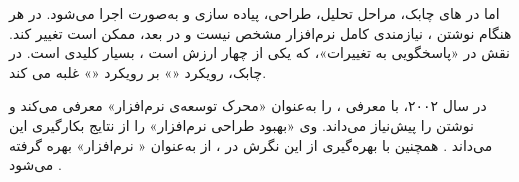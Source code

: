 اما در ‌های چابک، مراحل تحلیل، طراحی، پیاده سازی و
 به‌صورت  اجرا می‌شود. در هر  هنگام
نوشتن ، نیازمندی کامل نرم‌افزار مشخص نیست و در 
بعد، ممکن است تغییر کند. نقش  در «پاسخگویی به تغییرات»، که
یکی از چهار ارزش  است ، بسیار کلیدی
است. در  چابک، رویکرد «» بر رویکرد «» غلبه می
کند.

 در سال ۲۰۰۲، با معرفی 
،  را به‌عنوان «محرک توسعه‌ی نرم‌افزار» معرفی
می‌کند و نوشتن  را پیش‌نیاز  می‌داند. وی
«بهبود طراحی نرم‌افزار» را از نتایج بکارگیری این  می‌داند
. همچنین با بهره‌گیری از این نگرش در 
، از  به‌عنوان «
نرم‌افزار» بهره گرفته می‌شود .



